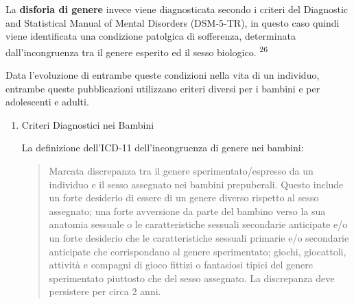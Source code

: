 \documentclass[11pt]{article}
\makeatletter
\newcommand{\cslcitation}[2]
 {\protect\hyper@linkstart{cite}{citeproc_bib_item_#1}#2\hyper@linkend}
\makeatother
\begin{document}
La \textbf{disforia di genere} invece viene diagnosticata secondo i criteri del Diagnostic and Statistical Manual of Mental Disorders (DSM-5-TR), in questo caso quindi viene identificata una condizione patolgica di sofferenza, determinata dall'incongruenza tra il genere esperito ed il sesso biologico. \textsuperscript{\cslcitation{26}{26}}

Data l'evoluzione di entrambe queste condizioni nella vita di un individuo, entrambe queste pubblicazioni utilizzano criteri diversi per i bambini e per adolescenti e adulti.
\begin{enumerate}
\item Criteri Diagnostici nei Bambini
\label{sec:org39415a1}

La definizione dell'ICD-11 dell'incongruenza di genere nei bambini:

\begin{quote}
Marcata discrepanza tra il  genere sperimentato/espresso da un individuo e il sesso assegnato nei bambini prepuberali.  Questo include un forte desiderio di essere di un genere diverso rispetto al sesso assegnato; una  forte avversione da parte del bambino verso la sua anatomia sessuale o le caratteristiche sessuali  secondarie anticipate e/o un forte desiderio che le caratteristiche sessuali primarie e/o secondarie  anticipate che corrispondano al genere sperimentato; giochi, giocattoli, attività e compagni di  gioco fittizi o fantasiosi tipici del genere sperimentato piuttosto che del sesso assegnato. La discrepanza deve persistere per circa 2 anni.
\end{quote}



\end{enumerate}
\end{document}
